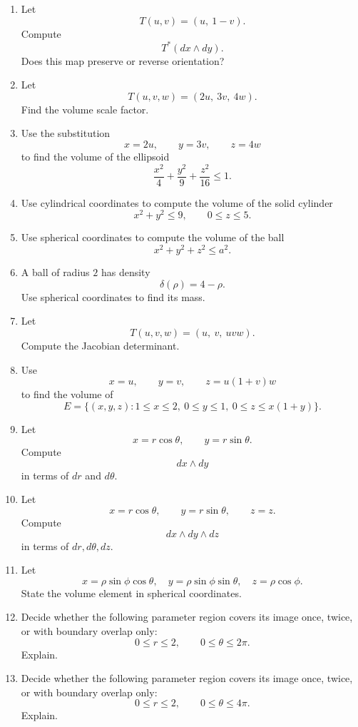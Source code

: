 \begin{enumerate}
\item Let
\[
    T(u,v)=(u,\ 1-v).
\]
Compute
\[
    T^*(dx\wedge dy).
\]
Does this map preserve or reverse orientation?

\item Let
\[
    T(u,v,w)=(2u,\ 3v,\ 4w).
\]
Find the volume scale factor.

\item Use the substitution
\[
    x=2u,\qquad y=3v,\qquad z=4w
\]
to find the volume of the ellipsoid
\[
    \frac{x^2}{4}+\frac{y^2}{9}+\frac{z^2}{16}\le1.
\]

\item Use cylindrical coordinates to compute the volume of the solid cylinder
\[
    x^2+y^2\le9,
    \qquad
    0\le z\le5.
\]

\item Use spherical coordinates to compute the volume of the ball
\[
    x^2+y^2+z^2\le a^2.
\]

\item A ball of radius \(2\) has density
\[
    \delta(\rho)=4-\rho.
\]
Use spherical coordinates to find its mass.

\item Let
\[
    T(u,v,w)=(u,\ v,\ uvw).
\]
Compute the Jacobian determinant.

\item Use
\[
    x=u,\qquad y=v,\qquad z=u(1+v)w
\]
to find the volume of
\[
    E=\{(x,y,z):1\le x\le2,\ 0\le y\le1,\ 0\le z\le x(1+y)\}.
\]

\item Let
\[
    x=r\cos\theta,
    \qquad
    y=r\sin\theta.
\]
Compute
\[
    dx\wedge dy
\]
in terms of \(dr\) and \(d\theta\).

\item Let
\[
    x=r\cos\theta,
    \qquad
    y=r\sin\theta,
    \qquad
    z=z.
\]
Compute
\[
    dx\wedge dy\wedge dz
\]
in terms of \(dr,d\theta,dz\).

\item Let
\[
    x=\rho\sin\phi\cos\theta,
    \quad
    y=\rho\sin\phi\sin\theta,
    \quad
    z=\rho\cos\phi.
\]
State the volume element in spherical coordinates.

\item Decide whether the following parameter region covers its image once, twice, or with
boundary overlap only:
\[
    0\le r\le2,\qquad 0\le\theta\le2\pi.
\]
Explain.

\item Decide whether the following parameter region covers its image once, twice, or with
boundary overlap only:
\[
    0\le r\le2,\qquad 0\le\theta\le4\pi.
\]
Explain.


\end{enumerate}

